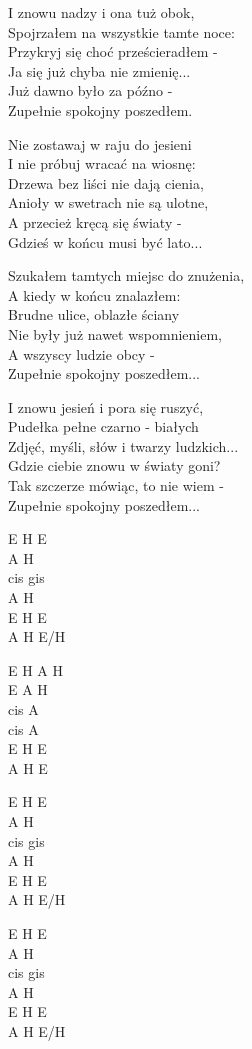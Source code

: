 \begin{text}
I znowu nadzy i ona tuż obok,\\
Spojrzałem na wszystkie tamte noce:\\
Przykryj się choć prześcieradłem -\\
Ja się już chyba nie zmienię...\\
Już dawno było za późno -\\
Zupełnie spokojny poszedłem.

\vin Nie zostawaj w raju do jesieni\\
\vin I nie próbuj wracać na wiosnę:\\
\vin Drzewa bez liści nie dają cienia,\\
\vin Anioły w swetrach nie są ulotne,\\
\vin A przecież kręcą się światy -\\
\vin Gdzieś w końcu musi być lato...

Szukałem tamtych miejsc do znużenia,\\
A kiedy w końcu znalazłem:\\
Brudne ulice, oblazłe ściany\\
Nie były już nawet wspomnieniem,\\
A wszyscy ludzie obcy -\\
Zupełnie spokojny poszedłem...

I znowu jesień i pora się ruszyć,\\
Pudełka pełne czarno - białych\\
Zdjęć, myśli, słów i twarzy ludzkich...\\
Gdzie ciebie znowu w światy goni?\\
Tak szczerze mówiąc, to nie wiem -\\
Zupełnie spokojny poszedłem...
\end{text}
\begin{chord}
    E H E\\
    A H\\
    cis gis\\
    A H\\
    E H E\\
    A H E/H

    E H A H\\
    E A H\\
    cis A\\
    cis A\\
    E H E\\
    A H E

    E H E\\
    A H\\
    cis gis\\
    A H\\
    E H E\\
    A H E/H

    E H E\\
    A H\\
    cis gis\\
    A H\\
    E H E\\
    A H E/H
\end{chord}